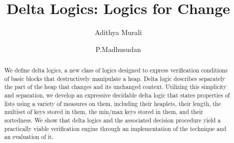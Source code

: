 \documentclass{llncs}
\begin{document}
\newcommand{\HLS}{\textit{HLS}}
\newcommand{\sem}[1]{\llbracket #1 \rrbracket}
\newcommand{\vect}[1]{\overline{#1}}
\pagestyle{plain} %

\title{Delta Logics: Logics for Change}
\author{Adithya Murali \and
  P.\@ Madhusudan
}


\maketitle

\begin{abstract}
We define delta logics, a new class of logics designed to express verification conditions
of basic blocks that destructively manipulate a heap. Delta logic describes separately the part of the heap that changes
and its unchanged context. Utilizing this simplicity and separation, we develop an expressive decidable
delta logic that states properties of lists using a variety of measures on them, including their heaplets, 
their length, the multiset of keys stored in them, the min/max keys stored in them, and their sortedness. We show that 
delta logics and the associated decision procedure yield a practically viable verification engine through an 
implementation of the technique and an evaluation of it.
\end{abstract}









\newpage





\end{document}
